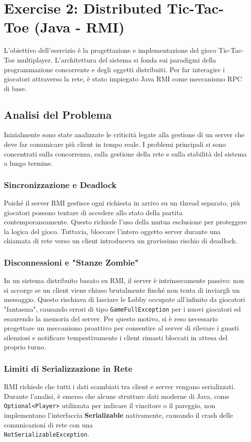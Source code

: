 \section{Exercise 2: Distributed Tic-Tac-Toe (Java - RMI)}
L'obiettivo dell'esercizio è la progettazione e implementazione del gioco  Tic-Tac-Toe multiplayer. L'architettura del sistema si fonda sui paradigmi della programmazione concorrente e degli oggetti distribuiti. Per far interagire i giocatori attraverso la rete, è stato impiegato Java RMI come meccanismo RPC di base.

\subsection{Analisi del Problema}
Inizialmente sono state analizzate le criticità legate alla gestione di un server che deve far comunicare più client in tempo reale. I problemi principali si sono concentrati sulla concorrenza, sulla gestione della rete e sulla stabilità del sistema a lungo termine.

\subsubsection{Sincronizzazione e Deadlock}
Poiché il server RMI gestisce ogni richiesta in arrivo su un thread separato, più giocatori possono tentare di accedere allo stato della partita contemporaneamente. Questo richiede l'uso della mutua esclusione per proteggere la logica del gioco. Tuttavia, bloccare l'intero oggetto server durante una chiamata di rete verso un client introduceva un gravissimo rischio di deadlock.

\subsubsection{Disconnessioni e "Stanze Zombie"}
In un sistema distribuito basato su RMI, il server è intrinsecamente passivo: non si accorge se un client viene chiuso brutalmente finché non tenta di inviargli un messaggio. Questo rischiava di lasciare le Lobby occupate all'infinito da giocatori "fantasma", causando errori di tipo \texttt{GameFullException} per i nuovi giocatori ed esaurendo la memoria del server.
Per questo motivo, si è reso necessario progettare un meccanismo proattivo per consentire al server di rilevare i guasti silenziosi e notificare tempestivamente i client rimasti bloccati in attesa del proprio turno.

\subsubsection{Limiti di Serializzazione in Rete}
RMI richiede che tutti i dati scambiati tra client e server vengano serializzati. Durante l'analisi, è emerso che alcune strutture dati moderne di Java, come \texttt{Optional<Player>} utilizzata per indicare il vincitore o il pareggio, non implementano l'interfaccia \textbf{Serializable} nativamente, causando il crash delle comunicazioni di rete con una \\\texttt{NotSerializableException}.

